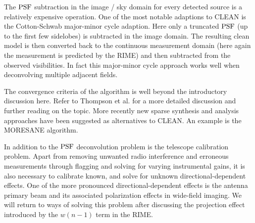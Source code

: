 The $\textrm{PSF}$ subtraction in the image / sky domain for every detected source is a relatively expensive operation. One of the
most notable adaptions to CLEAN is the Cotton-Schwab major-minor cycle adaption. Here only a truncated
$\textrm{PSF}$ (up to the first few sidelobes) is subtracted in the image domain. The resulting clean model is then converted back
to the continuous measurement domain (here again the measurement is predicted by the RIME) and then subtracted from the 
observed visibilities. In fact this major-minor cycle approach works well when deconvolving multiple adjacent fields. 

The convergence criteria of the algorithm is well beyond the introductory discussion here. Refer to Thompson et 
al. \cite[ch 11]{thompson2008interferometry} for a more detailed discussion and further reading on the topic. More
recently new sparse synthesis and analysis approaches have been suggested as alternatives to CLEAN. An example is the 
MORESANE \cite{dabbech2015moresane} algorithm.

In addition to the $\textrm{PSF}$ deconvolution problem is the telescope calibration problem. Apart from removing unwanted
radio interference and erroneous measurements through flagging and solving for varying instrumental gains, it is also
necessary to calibrate known, and solve for unknown directional-dependent effects. One of the more pronounced directional-dependent 
effects is the antenna primary beam and its associated polarization effects in wide-field imaging. We will return
to ways of solving this problem after discussing the projection effect introduced by the $w(n-1)$ term in the RIME.

